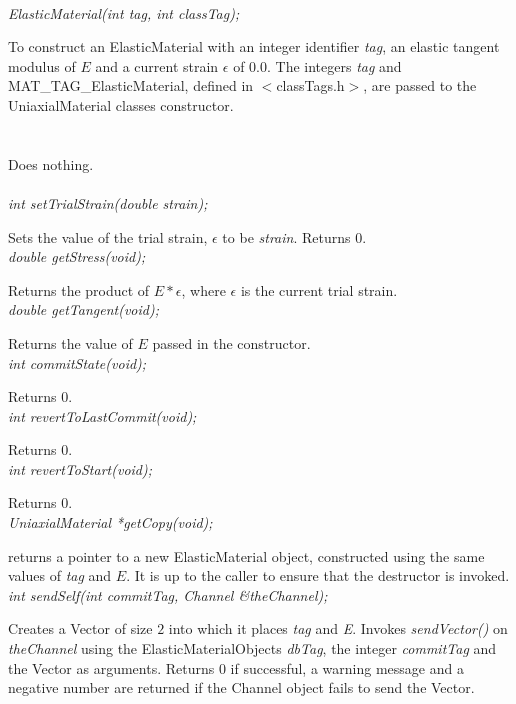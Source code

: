   \\
{\em ElasticMaterial(int tag, int classTag);}  

To construct an ElasticMaterial with an integer identifier {\em
tag}, an elastic tangent modulus of $E$ and a current strain
$\epsilon$ of $0.0$. The integers {\em tag} and
MAT\_TAG\_ElasticMaterial, defined in $<$classTags.h$>$, are passed 
to the UniaxialMaterial classes constructor. \\

 \\
\\ 
Does nothing. \\

 \\
{\em int setTrialStrain(double strain); }  

Sets the value of the trial strain, $\epsilon$ to be {\em
strain}. Returns $0$.\\

{\em double getStress(void); } 

Returns the product of $E * \epsilon$, where $\epsilon$ is the current
trial strain. \\

{\em double getTangent(void); } 

Returns the value of $E$ passed in the constructor. \\

{\em int commitState(void); } 

Returns $0$. \\

{\em int revertToLastCommit(void); } 

Returns $0$. \\

{\em int revertToStart(void); } 

Returns $0$. \\

{\em UniaxialMaterial *getCopy(void); } 

returns a pointer to a new ElasticMaterial object, constructed
using the same values of {\em tag} and $E$. It is up to the caller to
ensure that the destructor is invoked. \\

{\em    int sendSelf(int commitTag, Channel \&theChannel); }

Creates a Vector of size $2$ into which it places  {\em tag} and
{\em E}. Invokes {\em sendVector()} on  {\em theChannel} using the
ElasticMaterialObjects {\em dbTag}, the integer {\em commitTag} and
the Vector as arguments. Returns $0$ if successful, a warning message
and a negative number are returned if the Channel object fails to send
the Vector. \\

